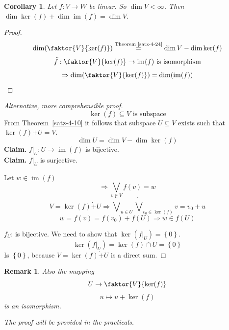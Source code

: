 \documentclass[a4paper,landscape,twocolumn]{article}
\newcommand\set[1]{\left\{#1\right\}}
\newtheorem{rem}{Remark}
\newtheorem{cor}{Corollary}
\DeclareMathOperator\image{im} %
\DeclareMathOperator\kernel{ker} %
\begin{document}
\begin{cor}
  \label{Korrolar-5-22}
  Let $f: V \rightarrow W$ be linear. So $\dim{V} < \infty$.
  Then $\dim{\kernel(f)} + \dim{\image(f)} = \dim{V}$.
\end{cor}
\begin{proof}
  \[ \dim(\faktor{V}{\kernel(f)}) \stackrel{\text{Theorem~\ref{satz-4-24}}}{=} \dim{V} - \dim{\kernel(f)} \]
  \[ \tilde{f}: \faktor{V}{\kernel(f)} \rightarrow \image(f) \text{ is isomorphism} \]
  \[ \Rightarrow \dim(\faktor{V}{\kernel(f)}) = \dim(\image(f)) \]
\end{proof}
\begin{proof}[Alternative, more comprehensible proof]
  \[ \kernel(f) \subseteq V \text{ is subspace} \]
  From Theorem~\ref{satz-4-10} it follows that subspace $U \subseteq V$ exists
  such that $\kernel(f) \dot{+} U = V$.
  \[ \dim{U} = \dim{V} - \dim{\kernel(f)} \]
  \textbf{Claim.} $f|_U: U \rightarrow \image(f)$ is bijective. \\
  \textbf{Claim.} $f|_U$ is surjective.

  Let $w \in \image(f)$
  \[ \Rightarrow \bigvee_{v \in V} f(v) = w \]
  \[ V = \kernel(f) \dot{+} U \Rightarrow \dot\bigvee_{u \in U} \dot\bigvee_{v_0 \in \kernel(f)} v = v_0 + u \]
  \[ w = f(v) = f(v_0) + f(U) \Rightarrow w \in f(U) \]

  $f_U$: is bijective. We need to show that $\kernel(f|_U) = \set{0}$.
  \[ \kernel(f|_U) = \kernel(f) \cap U = \set{0} \]
  Is $\set{0}$, because $V = \kernel(f) \dot{+} U$ is a direct sum.
\end{proof}
%
\begin{rem}
  Also the mapping
  \[ U \to \faktor{V}{\kernel(f)} \]
  \[ u \mapsto u + \kernel(f) \]
  is an isomorphism.

  The proof will be provided in the practicals.
\end{rem}
\end{document}

